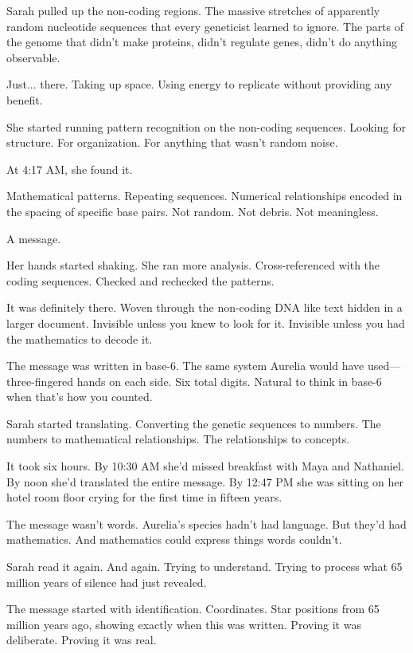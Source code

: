 Sarah pulled up the non-coding regions. The massive stretches of apparently random nucleotide sequences that every geneticist learned to ignore. The parts of the genome that didn't make proteins, didn't regulate genes, didn't do anything observable.

Just... there. Taking up space. Using energy to replicate without providing any benefit.

She started running pattern recognition on the non-coding sequences. Looking for structure. For organization. For anything that wasn't random noise.

At 4:17 AM, she found it.

Mathematical patterns. Repeating sequences. Numerical relationships encoded in the spacing of specific base pairs. Not random. Not debris. Not meaningless.

A message.

Her hands started shaking. She ran more analysis. Cross-referenced with the coding sequences. Checked and rechecked the patterns.

It was definitely there. Woven through the non-coding DNA like text hidden in a larger document. Invisible unless you knew to look for it. Invisible unless you had the mathematics to decode it.

The message was written in base-6. The same system Aurelia would have used—three-fingered hands on each side. Six total digits. Natural to think in base-6 when that's how you counted.

Sarah started translating. Converting the genetic sequences to numbers. The numbers to mathematical relationships. The relationships to concepts.

It took six hours. By 10:30 AM she'd missed breakfast with Maya and Nathaniel. By noon she'd translated the entire message. By 12:47 PM she was sitting on her hotel room floor crying for the first time in fifteen years.

\scenebreak

The message wasn't words. Aurelia's species hadn't had language. But they'd had mathematics. And mathematics could express things words couldn't.

Sarah read it again. And again. Trying to understand. Trying to process what 65 million years of silence had just revealed.

The message started with identification. Coordinates. Star positions from 65 million years ago, showing exactly when this was written. Proving it was deliberate. Proving it was real.

